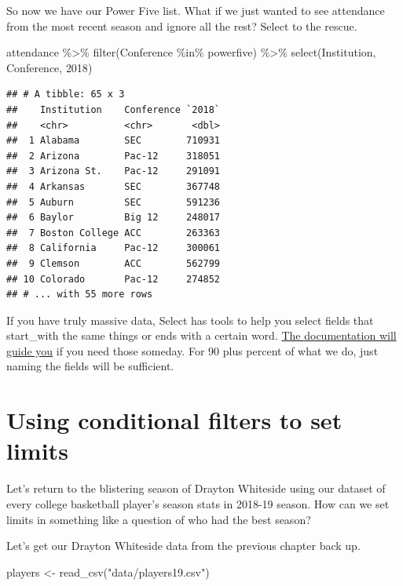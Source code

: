 \documentclass[
]{book}
\newenvironment{Shaded}{\begin{snugshade}}{\end{snugshade}}
\newcommand{\AttributeTok}[1]{\textcolor[rgb]{0.77,0.63,0.00}{#1}}
\newcommand{\FunctionTok}[1]{\textcolor[rgb]{0.00,0.00,0.00}{#1}}
\newcommand{\NormalTok}[1]{#1}
\newcommand{\OtherTok}[1]{\textcolor[rgb]{0.56,0.35,0.01}{#1}}
\newcommand{\SpecialCharTok}[1]{\textcolor[rgb]{0.00,0.00,0.00}{#1}}
\newcommand{\StringTok}[1]{\textcolor[rgb]{0.31,0.60,0.02}{#1}}
\begin{document}
So now we have our Power Five list. What if we just wanted to see attendance from the most recent season and ignore all the rest? Select to the rescue.

\begin{Shaded}
\begin{Highlighting}[]
\NormalTok{attendance }\SpecialCharTok{\%\textgreater{}\%} \FunctionTok{filter}\NormalTok{(Conference }\SpecialCharTok{\%in\%}\NormalTok{ powerfive) }\SpecialCharTok{\%\textgreater{}\%} \FunctionTok{select}\NormalTok{(Institution, Conference, }\StringTok{\textasciigrave{}}\AttributeTok{2018}\StringTok{\textasciigrave{}}\NormalTok{)}
\end{Highlighting}
\end{Shaded}

\begin{verbatim}
## # A tibble: 65 x 3
##    Institution    Conference `2018`
##    <chr>          <chr>       <dbl>
##  1 Alabama        SEC        710931
##  2 Arizona        Pac-12     318051
##  3 Arizona St.    Pac-12     291091
##  4 Arkansas       SEC        367748
##  5 Auburn         SEC        591236
##  6 Baylor         Big 12     248017
##  7 Boston College ACC        263363
##  8 California     Pac-12     300061
##  9 Clemson        ACC        562799
## 10 Colorado       Pac-12     274852
## # ... with 55 more rows
\end{verbatim}

If you have truly massive data, Select has tools to help you select fields that start\_with the same things or ends with a certain word. \href{https://dplyr.tidyverse.org/reference/select.html}{The documentation will guide you} if you need those someday. For 90 plus percent of what we do, just naming the fields will be sufficient.

\hypertarget{using-conditional-filters-to-set-limits}{%
\section{Using conditional filters to set limits}\label{using-conditional-filters-to-set-limits}}

Let's return to the blistering season of Drayton Whiteside using our dataset of every college basketball player's season stats in 2018-19 season. How can we set limits in something like a question of who had the best season?

Let's get our Drayton Whiteside data from the previous chapter back up.

\begin{Shaded}
\begin{Highlighting}[]
\NormalTok{players }\OtherTok{\textless{}{-}} \FunctionTok{read\_csv}\NormalTok{(}\StringTok{"data/players19.csv"}\NormalTok{)}
\end{Highlighting}
\end{Shaded}
\end{document}
